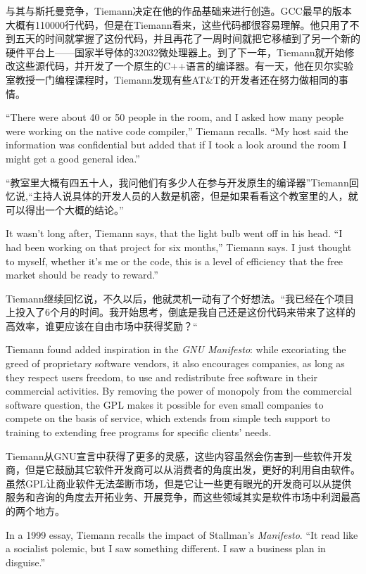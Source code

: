 \ifdefined\chs
与其与斯托曼竞争，Tiemann决定在他的作品基础来进行创造。GCC最早的版本大概有110000行代码，但是在Tiemann看来，这些代码都很容易理解。他只用了不到五天的时间就掌握了这份代码，并且再花了一周时间就把它移植到了另一个新的硬件平台上——国家半导体的32032微处理器上。到了下一年，Tiemann就开始修改这些源代码，并开发了一个原生的C++语言的编译器。有一天，他在贝尔实验室教授一门编程课程时，Tiemann发现有些AT\&T的开发者还在努力做相同的事情。
\fi

\ifdefined\eng
``There were about 40 or 50 people in the room, and I asked how many people were working on the native code compiler,'' Tiemann recalls. ``My host said the information was confidential but added that if I took a look around the room I might get a good general idea.''
\fi

\ifdefined\chs
“教室里大概有四五十人，我问他们有多少人在参与开发原生的编译器”Tiemann回忆说,“主持人说具体的开发人员的人数是机密，但是如果看看这个教室里的人，就可以得出一个大概的结论。”
\fi

\ifdefined\eng
It wasn't long after, Tiemann says, that the light bulb went off in his head. ``I had been working on that project for six months,'' Tiemann says. I just thought to myself, whether it's me or the code, this is a level of efficiency that the free market should be ready to reward.''
\fi

\ifdefined\chs
Tiemann继续回忆说，不久以后，他就灵机一动有了个好想法。“我已经在个项目上投入了6个月的时间。我开始思考，倒底是我自己还是这份代码来带来了这样的高效率，谁更应该在自由市场中获得奖励？“
\fi

\ifdefined\eng
Tiemann found added inspiration in the \textit{GNU Manifesto}: while excoriating the greed of proprietary software vendors, it also encourages companies, as long as they respect users freedom, to use and redistribute free software in their commercial activities. By removing the power of monopoly from the commercial software question, the GPL makes it possible for even small companies to compete on the basis of service, which extends from simple tech support to training to extending free programs for specific clients' needs.
\fi

\ifdefined\chs
Tiemann从GNU宣言中获得了更多的灵感，这些内容虽然会伤害到一些软件开发商，但是它鼓励其它软件开发商可以从消费者的角度出发，更好的利用自由软件。虽然GPL让商业软件无法垄断市场，但是它让一些更有眼光的开发商可以从提供服务和咨询的角度去开拓业务、开展竞争，而这些领域其实是软件市场中利润最高的两个地方。
\fi

\ifdefined\eng
In a 1999 essay, Tiemann recalls the impact of Stallman's \textit{Manifesto}. ``It read like a socialist polemic, but I saw something different. I saw a business plan in disguise.''
\fi

